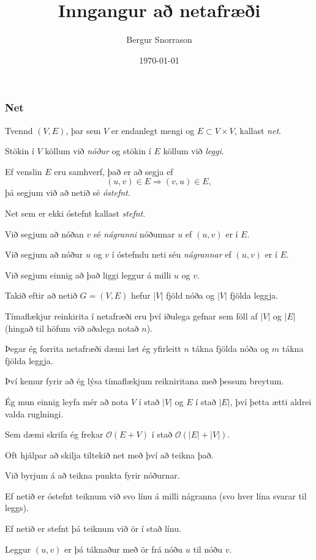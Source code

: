 \title{Inngangur að netafræði}
\author{Bergur Snorrason}
\date{\today}



\frame{\titlepage}

{
	\frametitle{Net}
	{
		\item<1-> Tvennd $(V, E)$, þar sem $V$ er endanlegt mengi og $E \subset V \times V$, kallast \emph{net}.
		\item<2-> Stökin í $V$ köllum við \emph{nóður} og stökin í $E$ köllum við \emph{leggi}.
		\item<3-> Ef venslin $E$ eru samhverf, það er að segja ef 
					\[
						(u, v) \in E \Rightarrow (v, u) \in E,
					\]
					þá segjum við að netið sé \emph{óstefnt}.
		\item<4-> Net sem er ekki óstefnt kallast \emph{stefnt}.
		\item<5-> Við segjum að nóðan $v$ sé \emph{nágranni} nóðunnar $u$ ef $(u, v)$ er í $E$.
		\item<6-> Við segjum að nóður $u$ og $v$ í óstefndu neti séu \emph{nágrannar} ef $(u, v)$ er í $E$.
		\item<7-> Við segjum einnig að það liggi leggur á milli $u$ og $v$.
	}
}

{
	{
		\item<1-> Takið eftir að netið $G = (V, E)$ hefur $|V|$ fjöld nóða og $|V|$ fjölda leggja.
		\item<2-> Tímaflækjur reinkirita í netafræði eru því iðulega gefnar sem föll af $|V|$ og $|E|$ (hingað til höfum við aðalega notað $n$).
		\item<3-> Þegar ég forrita netafræði dæmi læt ég yfirleitt $n$ tákna fjölda nóða og $m$ tákna fjölda leggja.
		\item<4-> Því kemur fyrir að ég lýsa tímaflækjum reikniritana með þessum breytum.
		\item<5-> Ég mun einnig leyfa mér að nota $V$ í stað $|V|$ og $E$ í stað $|E|$, því þetta ætti aldrei valda ruglningi.
		\item<6-> Sem dæmi skrifa ég frekar $\mathcal{O}(E + V)$ í stað $\mathcal{O}(|E| + |V|)$.
	}
}

{
	{
		\item<1-> Oft hjálpar að skilja tiltekið net með því að teikna það.
		\item<2-> Við byrjum á að teikna punkta fyrir nóðurnar.
		\item<3-> Ef netið er óstefnt teiknum við svo línu á milli nágranna (svo hver lína svarar til leggs).
		\item<4-> Ef netið er stefnt þá teiknum við ör í stað línu.
		\item<5-> Leggur $(u, v)$ er þá táknaður með ör frá nóðu $u$ til nóðu $v$.
	}
}

